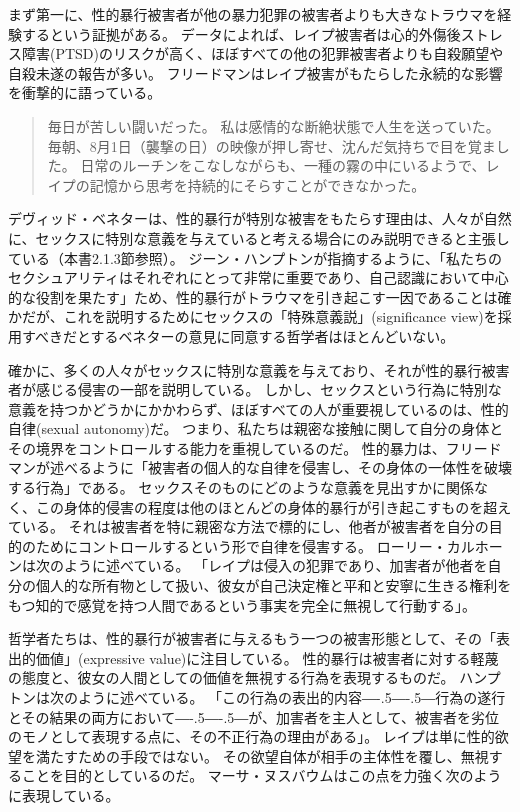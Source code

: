 \documentclass[paper=a4,book,openany]{jlreq}
\newcommand{\ig}[1]{}           %
\def\DDASH{―\kern-.5\zw―\kern-.5\zw―} %
\begin{document}
まず第一に、性的暴行被害者が他の暴力犯罪の被害者よりも大きなトラウマを経験するという証拠がある。
データによれば、レイプ被害者は心的外傷後ストレス障害(PTSD)のリスクが高く、ほぼすべての他の犯罪被害者よりも自殺願望や自殺未遂の報告が多い\citep[p.104]{wertheimer03:_consen_sexual_relat}。
フリードマン\ig{Karyn L. Freedman}はレイプ被害がもたらした永続的な影響を衝撃的に語っている。

\begin{quote}
毎日が苦しい闘いだった。
私は感情的な断絶状態で人生を送っていた。
毎朝、8月1日（襲撃の日）の映像が押し寄せ、沈んだ気持ちで目を覚ました。
日常のルーチンをこなしながらも、一種の霧の中にいるようで、レイプの記憶から思考を持続的にそらすことができなかった。
\citep{freedman14:_one_hour_paris}
\end{quote}

デヴィッド・ベネターは、性的暴行が特別な被害をもたらす理由は、人々が自然に、セックスに特別な意義を与えていると考える場合にのみ説明できると主張している（本書2.1.3節参照）。
ジーン・ハンプトン\ig{Jean Hampton}が指摘するように、「私たちのセクシュアリティはそれぞれにとって非常に重要であり、自己認識において中心的な役割を果たす」ため、性的暴行がトラウマを引き起こす一因であることは確かだが、これを説明するためにセックスの「特殊意義説」(significance view)を採用すべきだとするベネター\ig{Benatar}の意見に同意する哲学者はほとんどいない\citep[p.151]{hampton99:_defin_wrong_and_defin_rape}。

確かに、多くの人々がセックスに特別な意義を与えており、それが性的暴行被害者が感じる侵害の一部を説明している。
しかし、セックスという行為に特別な意義を持つかどうかにかかわらず、ほぼすべての人が重要視しているのは、性的自律(sexual autonomy)だ。
つまり、私たちは親密な接触に関して自分の身体とその境界をコントロールする能力を重視しているのだ。
性的暴力は、フリードマン\ig{Karyn L. Freedman}が述べるように「被害者の個人的な自律を侵害し、その身体の一体性を破壊する行為」である。
セックスそのものにどのような意義を見出すかに関係なく、この身体的侵害の程度は他のほとんどの身体的暴行が引き起こすものを超えている。
それは被害者を特に親密な方法で標的にし、他者が被害者を自分の目的のためにコントロールするという形で自律を侵害する。
ローリー・カルホーンは次のように述べている。
「レイプは侵入の犯罪であり、加害者が他者を自分の個人的な所有物として扱い、彼女が自己決定権と平和と安寧に生きる権利をもつ知的で感覚を持つ人間であるという事実を完全に無視して行動する」\citep[p.109]{calhoun97:_rape}。

哲学者たちは、性的暴行が被害者に与えるもう一つの被害形態として、その「表出的価値」(expressive value)に注目している。
性的暴行は被害者に対する軽蔑の態度と、彼女の人間としての価値を無視する行為を表現するものだ。
ハンプトンは次のように述べている。
「この行為の表出的内容{\DDASH}行為の遂行とその結果の両方において{\DDASH}が、加害者を主人として、被害者を劣位のモノとして表現する点に、その不正行為の理由がある」\citep[p.135]{hampton99:_defin_wrong_and_defin_rape}。
レイプは単に性的欲望を満たすための手段ではない。
その欲望自体が相手の主体性を覆し、無視することを目的としているのだ。
マーサ・ヌスバウムはこの点を力強く次のように表現している。
\end{document}
